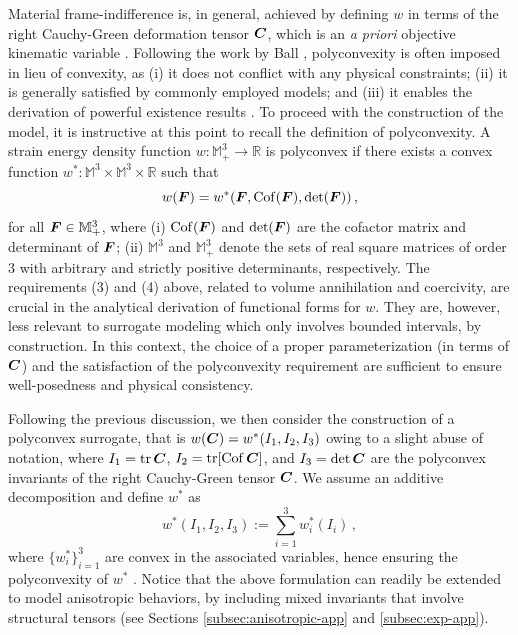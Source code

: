 Material frame-indifference is, in general, achieved by defining $w$ in terms of the right Cauchy-Green deformation tensor $\boldsymbol{C}$, which is an \textit{a priori} objective kinematic variable \cite{truesdell2004non}. Following the work by Ball \cite{ball1976convexity}, polyconvexity is often imposed in lieu of convexity, as (i) it does not conflict with any physical constraints; (ii) it is generally satisfied by commonly employed models; and (iii) it enables the derivation of powerful existence results \cite{ciarlet1988mathematical}. To proceed with the construction of the model, it is instructive at this point to recall the definition of polyconvexity. A strain energy density function $w:\mathbb{M}_+^3 \to \mathbb{R}$ is polyconvex if there exists a convex function $w^*:\mathbb{M}^3 \times \mathbb{M}^3 \times \mathbb{R}$ such that
\begin{equation}  
    w(\boldsymbol{F}) = w^*(\boldsymbol{F}, \mathrm{Cof}(\boldsymbol{F}), \det(\boldsymbol{F}))\,, 
\end{equation}
for all $\boldsymbol{F} \in \mathbb{M}_+^3$, where (i) $\mathrm{Cof}(\boldsymbol{F})$ and $\det(\boldsymbol{F})$ are the cofactor matrix and determinant of $\boldsymbol{F}$; (ii) $\mathbb{M}^3$ and $\mathbb{M}_+^3$ denote the sets of real square matrices of order $3$ with arbitrary and strictly positive determinants, respectively. The requirements (3) and (4) above, related to volume annihilation and coercivity, are crucial in the analytical derivation of functional forms for $w$. They are, however, less relevant to surrogate modeling which only involves bounded intervals, by construction. In this context, the choice of a proper parameterization (in terms of $\boldsymbol{C}$) and the satisfaction of the polyconvexity requirement are sufficient to ensure well-posedness and physical consistency. 

Following the previous discussion, we then consider the construction of a polyconvex surrogate, that is $w(\boldsymbol{C}) = w^*(I_1, I_2, I_3)$
owing to a slight abuse of notation, where $I_1 = \operatorname{tr} \boldsymbol{C}$, $I_2 = \operatorname{tr} [ \mathrm{Cof}\,\boldsymbol{C} ]$, and $I_3 = \det \boldsymbol{C}$ are the polyconvex invariants of the right Cauchy-Green tensor $\boldsymbol{C}$. We assume an additive decomposition and define $w^*$ as
\begin{equation}
    w^*(I_1, I_2, I_3) := \sum_{i = 1}^{3} w_i^*(I_i)\,,
\end{equation}
where $\{w_i^*\}_{i = 1}^3$ are convex in the associated variables, hence ensuring the polyconvexity of $w^*$ \cite{hartmann2003polyconvexity,schroder2003invariant}. Notice that the above formulation can readily be extended to model anisotropic behaviors, by including mixed invariants that involve structural tensors \cite{ebbing2010construction} (see Sections \ref{subsec:anisotropic-app} and \ref{subsec:exp-app}). 

